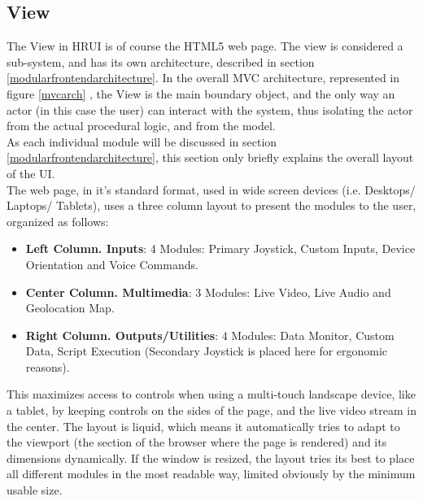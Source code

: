 \subsection{View}
The View in HRUI is of course the HTML5 web page. The view is considered a sub-system, and has its own architecture, 
described in section \ref{modularfrontendarchitecture}. In the overall MVC architecture, represented in figure \ref{mvcarch}
, the View is the main boundary object, and the only way an actor (in this case the user) can interact with the system, 
thus isolating the actor from the actual procedural logic, and from the model.\\

As each individual module will be discussed in section \ref{modularfrontendarchitecture}, this section only briefly 
explains the overall layout of the UI.\\

The web page, in it's standard format, used in wide screen devices (i.e. Desktops/ Laptops/ Tablets), uses a three column 
layout to present the modules to the user, organized as follows:
\begin{itemize}
	\item \textbf{Left Column. Inputs}: 4 Modules: Primary Joystick, Custom Inputs, Device Orientation and Voice Commands.
	\item \textbf{Center Column. Multimedia}: 3 Modules: Live Video, Live Audio and Geolocation Map.
	\item \textbf{Right Column. Outputs/Utilities}: 4 Modules: Data Monitor, Custom Data, Script Execution (Secondary 
	Joystick is placed here for ergonomic reasons). 
\end{itemize}
This maximizes access to controls when using a multi-touch landscape device, like a tablet, by keeping controls on the 
sides of the page, and the live video stream in the center. The layout is liquid, which means it automatically tries to 
adapt to the viewport (the section of the browser where the page is rendered) and its dimensions dynamically. If the window 
is resized, the layout tries its best to place all different modules in the most readable way, limited obviously by the 
minimum usable size.\\


